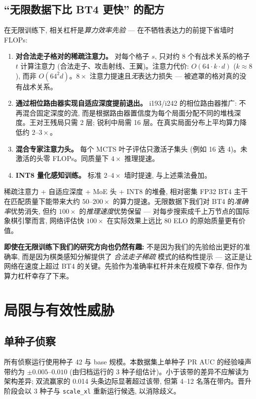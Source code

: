 \documentclass[10pt,a4paper]{article}
\begin{document}
\subsection{“无限数据下比 BT4 更快” 的配方}

在无限训练下, 相关杠杆是\emph{算力效率先验} --- 在不牺牲表达力的前提下省墙时 FLOPs:

\begin{enumerate}
\item \textbf{对合法走子格对的稀疏注意力。} 对每个格子 $s$, 只对约 8 个有战术关系的格子 $t$ 计算注意力 (合法走子、攻击射线、王翼)。注意力代价: $O(64 \cdot k \cdot d)$ ($k \approx 8$), 而非 $O(64^2 d)$。$8\times$ 注意力提速且\emph{无}表达力损失 --- 被遮罩的格对真的没有战术关系。
\item \textbf{通过相位路由器实现自适应深度提前退出。} i193/i242 的相位路由器推广: 不再混合固定深度的流, 而是根据路由器置信度为每个局面分配不同的堆栈深度。王对王残局只需 2 层; 锐利中局需 16 层。在真实局面分布上平均算力降低约 $2$--$3 \times$。
\item \textbf{混合专家注意力头。} 每个 MCTS 叶子评估只激活子集头 (例如 16 选 4)。未激活的头零 FLOPs。同质量下 $4\times$ 推理提速。
\item \textbf{INT8 量化感知训练。} 标准 $2$--$4\times$ 墙时提速, 与上述乘法叠加。
\end{enumerate}

\begin{tcolorbox}[callout, title=无限训练下的现实预期]
稀疏注意力 + 自适应深度 + MoE 头 + INT8 的堆叠, 相对密集 FP32 BT4 主干在匹配质量下能带来大约 $50$--$200\times$ 的算力提速。无限数据下我们对 BT4 的\emph{准确率}优势消失, 但约 $100\times$ 的\emph{推理速度}优势保留 --- 对每步搜索成千上万节点的国际象棋引擎而言, 网络评估快 $100\times$ 在实际效果上远比 $80$ ELO 的原始质量更有价值。
\end{tcolorbox}

\textbf{即使在无限训练下我们的研究方向也仍然有趣:} 不是因为我们的先验给出更好的准确率, 而是因为棋类感知分解提供了 \emph{合法走子稀疏} 模式的结构性提示 --- 这正是让网络在速度上超过 BT4 的关键。先验作为准确率杠杆并未在规模下幸存, 但作为算力杠杆幸存了下来。

\clearpage
\section{局限与有效性威胁}

\subsection*{单种子侦察}
所有侦察运行使用种子 42 与 base 规模。本数据集上单种子 PR AUC 的经验噪声带约为 $\pm 0.005$--$0.010$ (由归档运行的 3 种子组估计)。小于该带的差异不应解读为架构差异; 双流赢家的 0.014 头条边际显著超过该带, 但第 4--12 名落在带内。晋升阶段会以 3 种子与 \texttt{scale\_xl} 重新运行候选, 以消除歧义。
\end{document}
